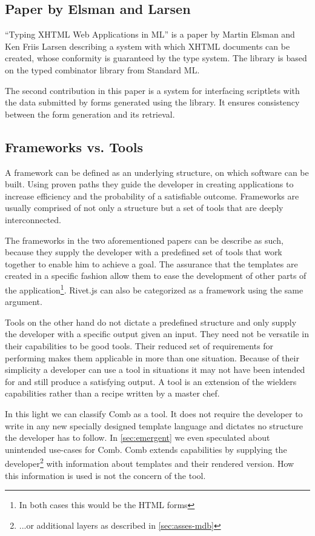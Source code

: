 \documentclass[thesis.tex]{subfiles}
\begin{document}
\subsection{Paper by Elsman and Larsen} %
``Typing XHTML Web Applications in ML''\cite{ML} is a paper by Martin Elsman and
Ken Friis Larsen describing a system with which XHTML documents can be created,
whose conformity is guaranteed by the type system. The library is based on the
typed combinator library from Standard ML.

The second contribution in this paper is a system for interfacing scriptlets
with the data submitted by forms generated using the library.
It ensures consistency between the form generation and its retrieval.

\subsection{Frameworks vs. Tools}
A framework can be defined as an underlying structure, on which software can be
built. Using proven paths they guide the developer in creating applications to
increase efficiency and the probability of a satisfiable outcome.
Frameworks are usually comprised of not only a structure but a set of tools that
are deeply interconnected.

The frameworks in the two aforementioned papers can be describe as such, because
they supply the developer with a predefined set of tools that work together to
enable him to achieve a goal. The assurance that the templates are created in a
specific fashion allow them to ease the development of other parts of the
application\footnote{In both cases this would be the HTML forms}. Rivet.js can
also be categorized as a framework using the same argument.

Tools on the other hand do not dictate a predefined structure and only supply
the developer with a specific output given an input. They need not be versatile
in their capabilities to be good tools. Their reduced set of requirements for
performing makes them applicable in more than one situation. Because of their
simplicity a developer can use a tool in situations it may not have been
intended for and still produce a satisfying output. A tool is an extension of
the wielders capabilities rather than a recipe written by a master chef.

In this light we can classify Comb as a tool. It does not require the developer
to write in any new specially designed template language and dictates no
structure the developer has to follow. In \ref{sec:emergent} we even speculated
about unintended use-cases for Comb. Comb extends capabilities by supplying the
developer\footnote{...or additional layers as described in \ref{sec:asses-mdb}}
with information about templates and their rendered version.
How this information is used is not the concern of the tool.
\end{document}
